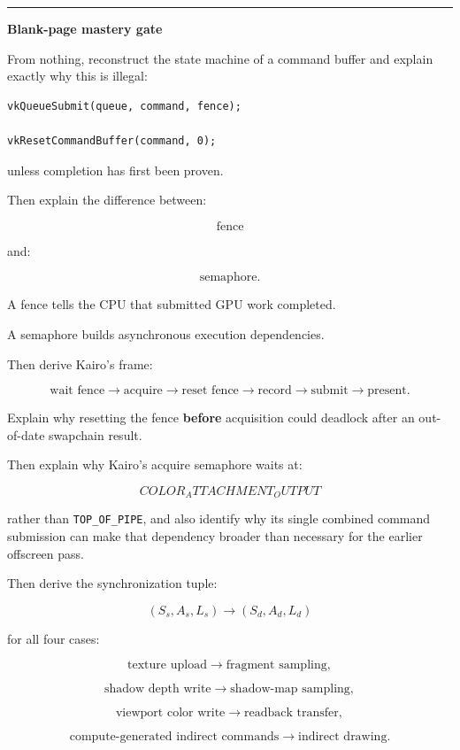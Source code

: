 \begin{center}\rule{0.5\linewidth}{0.5pt}\end{center}

\textbf{Blank-page mastery gate}

From nothing, reconstruct the state machine of a command buffer and explain exactly why this is illegal:

\begin{verbatim}
vkQueueSubmit(queue, command, fence);

vkResetCommandBuffer(command, 0);
\end{verbatim}

unless completion has first been proven.

Then explain the difference between:

\[
\boxed{\text{fence}}
\]

and:

\[
\boxed{\text{semaphore}}.
\]

A fence tells the CPU that submitted GPU work completed.

A semaphore builds asynchronous execution dependencies.

Then derive Kairo's frame:

\[
\text{wait fence}
\rightarrow
\text{acquire}
\rightarrow
\text{reset fence}
\rightarrow
\text{record}
\rightarrow
\text{submit}
\rightarrow
\text{present}.
\]

Explain why resetting the fence \textbf{before} acquisition could deadlock after an out-of-date swapchain result.

Then explain why Kairo's acquire semaphore waits at:

\[
COLOR_ATTACHMENT_OUTPUT
\]

rather than \texttt{TOP\_OF\_PIPE}, and also identify why its single combined command submission can make that dependency broader than necessary for the earlier offscreen pass.

Then derive the synchronization tuple:

\[
\boxed{
(S_s,A_s,L_s)
\rightarrow
(S_d,A_d,L_d)
}
\]

for all four cases:

\[
\text{texture upload}
\rightarrow
\text{fragment sampling},
\]

\[
\text{shadow depth write}
\rightarrow
\text{shadow-map sampling},
\]

\[
\text{viewport color write}
\rightarrow
\text{readback transfer},
\]

\[
\text{compute-generated indirect commands}
\rightarrow
\text{indirect drawing}.
\]

